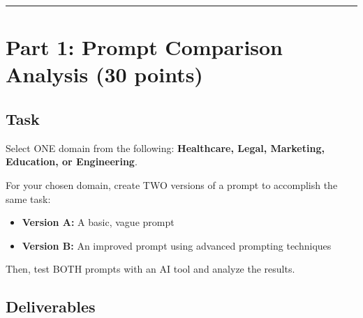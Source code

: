 \documentclass[11pt]{article}
\begin{document}
\vspace{0.5cm}

\hrule

\section{Part 1: Prompt Comparison Analysis (30 points)}

\subsection*{Task}

Select ONE domain from the following: \textbf{Healthcare, Legal, Marketing, Education, or Engineering}.

For your chosen domain, create TWO versions of a prompt to accomplish the same task:

\begin{itemize}
    \item \textbf{Version A:} A basic, vague prompt
    \item \textbf{Version B:} An improved prompt using advanced prompting techniques
\end{itemize}

Then, test BOTH prompts with an AI tool and analyze the results.

\subsection*{Deliverables}
\end{document}
